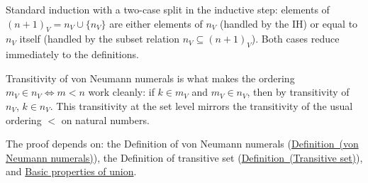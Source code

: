 \begin{remark*}
Standard induction with a two-case split in the inductive step: elements of
$(n+1)_V = n_V \cup \{n_V\}$ are either elements of $n_V$ (handled by the IH)
or equal to $n_V$ itself (handled by the subset relation $n_V \subseteq
(n+1)_V$). Both cases reduce immediately to the definitions.
\end{remark*}

\begin{remark*}
Transitivity of von Neumann numerals is what makes the ordering $m_V \in n_V
\Leftrightarrow m < n$ work cleanly: if $k \in m_V$ and $m_V \in n_V$, then
by transitivity of $n_V$, $k \in n_V$. This transitivity at the set level
mirrors the transitivity of the usual ordering $<$ on natural numbers.
\end{remark*}

\begin{remark*}[Dependencies]
The proof depends on: the Definition of von Neumann numerals
(\hyperref[def:vn-numerals]{Definition~(von Neumann numerals)}), the Definition
of transitive set (\hyperref[def:transitive-set]{Definition~(Transitive set)}),
and \hyperref[prop:union-basics]{Basic properties of union}.
\end{remark*}
